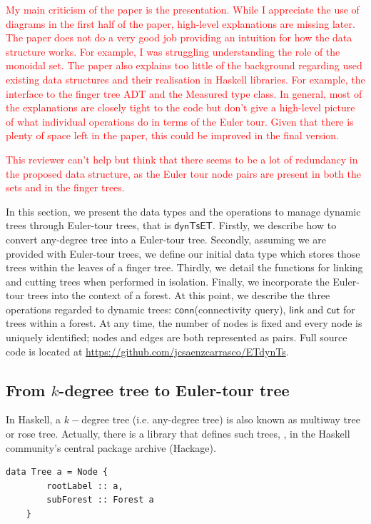 \documentclass{elsarticle}
\newcommand{\code}[1]{\haskell{#1}}
\newcommand{\tcr} [1]{\textcolor{red}{#1}}
\newcommand{\MATHSF}[1]{\ensuremath{\mathsf{#1}}\xspace}
\newcommand{\link}{\MATHSF{link}}
\newcommand{\cut}{\MATHSF{cut}}
\newcommand{\conn}{\MATHSF{conn}}
\newcommand{\dyntset}{\MATHSF{dynTsET}}
\begin{document}
\tcr{My main criticism of the paper is the presentation. While I appreciate the use of diagrams in the first half of the paper, high-level explanations are missing later. The paper does not do a very good job providing an intuition for how the data structure works. For example, I was struggling understanding the role of the monoidal set. The paper also explains too little of the background regarding used existing data structures and their realisation in Haskell libraries. For example, the interface to the finger tree ADT and the Measured type class. In general, most of the explanations are closely tight to the code but don’t give a high-level picture of what individual operations do in terms of the Euler tour. Given that there is plenty of space left in the paper, this could be improved in the final version.}

\tcr{This reviewer can't help but think that there seems to be a lot of redundancy in the proposed data structure, as the Euler tour node pairs are present in both the sets and in the finger trees.}

In this section, we present the data types and the operations to manage dynamic trees through Euler-tour trees, that is \dyntset. Firstly, we describe how to convert any-degree tree into a Euler-tour tree. Secondly, assuming we are provided with Euler-tour trees, we define our initial data type which stores those trees within the leaves of a finger tree. Thirdly, we detail the functions for linking and cutting trees when performed in isolation. Finally, we incorporate the Euler-tour trees into the context of a forest. At this point, we describe the three operations regarded to dynamic trees: \conn (connectivity query), \link and \cut for trees within a forest. At any time, the number of nodes is fixed and every node is uniquely identified; nodes and edges are both represented as pairs. Full source code is located at \url{https://github.com/jcsaenzcarrasco/ETdynTs}.


\subsection{From $k$-degree tree to Euler-tour tree}

In Haskell, a $k-$degree tree (i.e. any-degree tree) is also known as multiway tree or rose tree. Actually, there is a library that defines such trees, \code{Data.Tree}, in the Haskell community's central package archive (Hackage).

\begin{lstlisting}
data Tree a = Node {
        rootLabel :: a,         
        subForest :: Forest a   
    }
\end{lstlisting}
\end{document}
